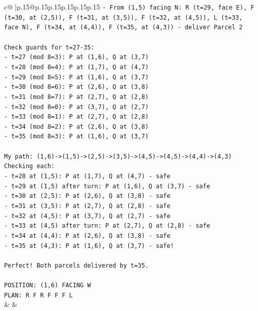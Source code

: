 \documentclass{article}
\begin{document}
{\begin{supertabular}{c@{$\;$}|p{.15\linewidth}@{}p{.15\linewidth}p{.15\linewidth}p{.15\linewidth}p{.15\linewidth}p{.15\linewidth}}
{{{\texttt{{-} From (1,5) facing N: R (t=29, face E), F (t=30, at (2,5)), F (t=31, at (3,5)), F (t=32, at (4,5)), L (t=33, face N), F (t=34, at (4,4)), F (t=35, at (4,3)) {-} deliver Parcel 2} \\
\\ 
\texttt{Check guards for t=27{-}35:} \\
\texttt{{-} t=27 (mod 8=3): P at (1,6), Q at (3,7)} \\
\texttt{{-} t=28 (mod 8=4): P at (1,7), Q at (4,7)} \\
\texttt{{-} t=29 (mod 8=5): P at (1,6), Q at (3,7)} \\
\texttt{{-} t=30 (mod 8=6): P at (2,6), Q at (3,8)} \\
\texttt{{-} t=31 (mod 8=7): P at (2,7), Q at (2,8)} \\
\texttt{{-} t=32 (mod 8=0): P at (3,7), Q at (2,7)} \\
\texttt{{-} t=33 (mod 8=1): P at (2,7), Q at (2,8)} \\
\texttt{{-} t=34 (mod 8=2): P at (2,6), Q at (3,8)} \\
\texttt{{-} t=35 (mod 8=3): P at (1,6), Q at (3,7)} \\
\\ 
\texttt{My path: (1,6){-}>(1,5){-}>(2,5){-}>(3,5){-}>(4,5){-}>(4,5){-}>(4,4){-}>(4,3)} \\
\texttt{Checking each:} \\
\texttt{{-} t=28 at (1,5): P at (1,7), Q at (4,7) {-} safe} \\
\texttt{{-} t=29 at (1,5) after turn: P at (1,6), Q at (3,7) {-} safe} \\
\texttt{{-} t=30 at (2,5): P at (2,6), Q at (3,8) {-} safe} \\
\texttt{{-} t=31 at (3,5): P at (2,7), Q at (2,8) {-} safe} \\
\texttt{{-} t=32 at (4,5): P at (3,7), Q at (2,7) {-} safe} \\
\texttt{{-} t=33 at (4,5) after turn: P at (2,7), Q at (2,8) {-} safe} \\
\texttt{{-} t=34 at (4,4): P at (2,6), Q at (3,8) {-} safe} \\
\texttt{{-} t=35 at (4,3): P at (1,6), Q at (3,7) {-} safe!} \\
\\ 
\texttt{Perfect! Both parcels delivered by t=35.} \\
\\ 
\texttt{POSITION: (1,6) FACING W} \\
\texttt{PLAN: R F R F F F L} \\
            }
        }
    }
    & & \\ \\


\end{supertabular}}
\end{document}
